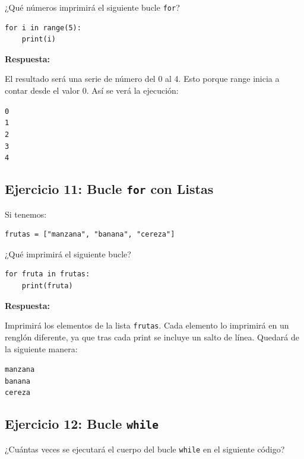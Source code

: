 \documentclass[12pt]{article}
\newcommand{\respuesta}{
    \vspace{0.3cm}
    \noindent\textbf{Respuesta:}
    \vspace{0.2cm}
}
\newcommand{\espaciopararespuesta}{
    \vspace{1.2cm}
}
\begin{document}
¿Qué números imprimirá el siguiente bucle \texttt{for}?

\begin{lstlisting}
for i in range(5):
    print(i)
\end{lstlisting}

\respuesta
El resultado será una serie de número del 0 al 4. Esto porque range inicia a contar desde el valor 0.
Así se verá la ejecución:
\begin{center}
\texttt{0}\\
\texttt{1}\\
\texttt{2}\\
\texttt{3}\\
\texttt{4}
\end{center}

\espaciopararespuesta

\subsection*{Ejercicio 11: Bucle \texttt{for} con Listas}

Si tenemos:

\begin{lstlisting}
frutas = ["manzana", "banana", "cereza"]
\end{lstlisting}

¿Qué imprimirá el siguiente bucle?

\begin{lstlisting}
for fruta in frutas:
    print(fruta)
\end{lstlisting}

\respuesta

Imprimirá los elementos de la lista \texttt{frutas}. Cada elemento lo imprimirá en un renglón diferente, ya que tras cada print se incluye un salto de línea. Quedará de la siguiente manera:
\begin{center}
\texttt{manzana}\\
\texttt{banana}\\
\texttt{cereza}
\end{center}

\subsection*{Ejercicio 12: Bucle \texttt{while}}

¿Cuántas veces se ejecutará el cuerpo del bucle \texttt{while} en el siguiente código?
\end{document}

